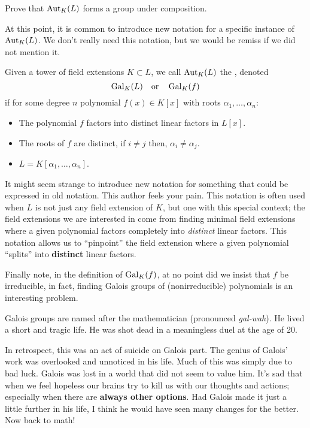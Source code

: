 \documentclass{ximera}
\begin{document}
\begin{exercise}
  Prove that $\operatorname{Aut}_K(L)$ forms a group under composition.
\end{exercise}


At this point, it is common to introduce new notation for a specific
instance of $\operatorname{Aut}_K(L)$. We don't really need this notation, but we would
be remiss if we did not mention it.


Given a tower of field extensions $K\subset L$, we call $\operatorname{Aut}_K(L)$
the ,
denoted
  \[
  \gal_K(L)\index{galKL@$\gal_K(L)$} \quad\text{or}\quad\gal_K(f)
  \]
  if for some degree $n$ polynomial $f(x)\in K[x]$ with roots $\alpha_1,\dots, \alpha_n$:
  \begin{itemize}
  \item The polynomial $f$ factors into distinct linear factors in
    $L[x]$.
  \item The roots of $f$ are distinct, if $i\ne j$ then, $\alpha_i \ne
    \alpha_j$.
  \item $L = K[\alpha_1,\dots,\alpha_n]$.
  \end{itemize}
It might seem strange to introduce new notation for something that
could be expressed in old notation. This author feels your pain. This
notation is often used when $L$ is not just any field extension of
$K$, but one with this special context; the field extensions we are
interested in come from finding minimal field extensions where a given
polynomial factors completely into \textit{distinct} linear factors.
This notation allows us to ``pinpoint'' the field extension where a
given polynomial ``splits'' into \textbf{distinct} linear factors.

Finally note, in the definition of $\operatorname{Gal}_K(f)$, at no point did we
insist that $f$ be irreducible, in fact, finding Galois groups of
(nonirreducible) polynomials is an interesting problem.


Galois groups are named after the mathematician  (pronounced
\textit{gal-wah}). He lived a short and tragic life. He was shot dead
in a meaningless duel at the age of 20.

In retrospect, this was an act of suicide on Galois part. The genius
of Galois' work was overlooked and unnoticed in his life.  Much of this
was simply due to bad luck. Galois was lost in a world that did not
seem to value him.  It's sad that when we feel hopeless our brains try
to kill us with our thoughts and actions; especially when there are
\textbf{always other options}. Had Galois
made it just a little further in his life, I think he would have seen
many changes for the better. Now back to math!
\end{document}
